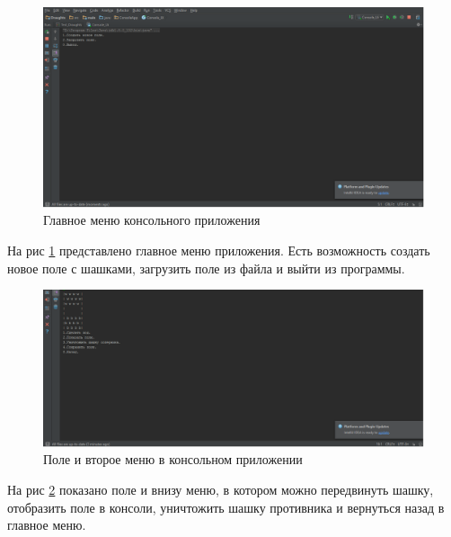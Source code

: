 \documentclass[a4paper]{article}
\begin{document}
\begin{figure}[H]
	\begin{center}
		\includegraphics[scale=0.5]{console}
		\caption{Главное меню консольного приложения} 
		\label{pic:console} %
	\end{center}
\end{figure}

На рис \ref{pic:console} представлено главное меню приложения. Есть возможность создать новое поле с шашками, загрузить поле из файла и выйти из программы. 

\begin{figure}[H]
	\begin{center}
		\includegraphics[scale=0.5]{console2}
		\caption{Поле и второе меню в консольном приложении} 
		\label{pic:secondMenu} %
	\end{center}
\end{figure}

На рис \ref{pic:secondMenu} показано поле и внизу меню, в котором можно передвинуть шашку, отобразить поле в консоли, уничтожить шашку противника и вернуться назад в главное меню.
\end{document}
